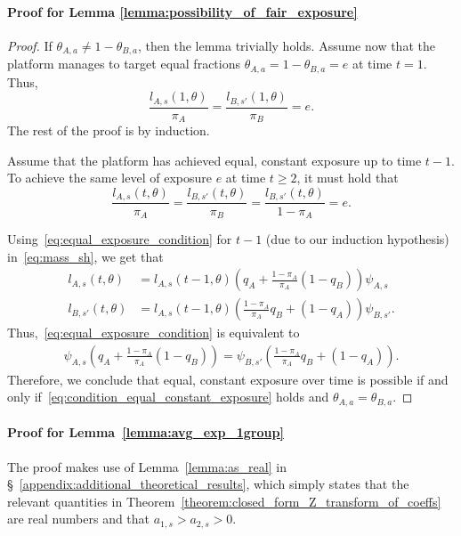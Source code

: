 \documentclass[letterpaper]{article} %
\begin{document}
\paragraph{Proof for Lemma \ref{lemma:possibility_of_fair_exposure}}
\begin{proof}
If $\theta_{A,a} \neq 1-\theta_{B,a} $, then the lemma trivially holds.
Assume now that the platform manages to target equal fractions $\theta_{A,a} = 1-\theta_{B,a} = e$ at time $t=1$. Thus,
\begin{equation*}
    \frac{l_{A,s}(1,\theta)}{\pi_A} = \frac{l_{B,s'}(1,\theta)}{\pi_B}=e.
\end{equation*}
The rest of the proof is by induction.

Assume that the platform has achieved equal, constant exposure up to time $t-1$. To achieve the same level of exposure $e$ at time $t\geq2$, it must hold that 
\begin{equation}
\label{eq:equal_exposure_condition}
\frac{l_{A,s}(t,\theta)}{\pi_A} = \frac{l_{B,s'}(t,\theta)}{\pi_B}= \frac{l_{B,s'}(t,\theta)}{1-\pi_A}=e.
\end{equation}

Using~\eqref{eq:equal_exposure_condition} for $t-1$ (due to our induction hypothesis) in~\eqref{eq:mass_sh}, we get that 
\begin{align*}
    l_{A,s}(t,\theta) &= l_{A,s}(t-1,\theta) \left( q_A + \frac{1-\pi_A}{\pi_A} (1-q_B)  \right) \psi_{A,s} \\
    l_{B,s'}(t,\theta) &= l_{A,s}(t-1,\theta) \left( \frac{1-\pi_A}{\pi_A} q_B + (1-q_A)  \right) \psi_{B,s'}.
\end{align*}
Thus,~\eqref{eq:equal_exposure_condition} is equivalent to
\begin{align*}
    \psi_{A,s}\left(q_A  + \frac{1-\pi_A}{\pi_A} (1-q_B) \right) = \psi_{B,s'}\left( \frac{1-\pi_A}{\pi_A} q_B  + (1-q_A)\right).
\end{align*}
Therefore, we conclude that equal, constant exposure over time is possible if and only if~\eqref{eq:condition_equal_constant_exposure} holds and $\theta_{A,a}= \theta_{B,a}$.
\end{proof}

\paragraph{Proof for Lemma~\ref{lemma:avg_exp_1group}}
The proof makes use of Lemma~\ref{lemma:as_real} in \S~\ref{appendix:additional_theoretical_results}, which simply states that the relevant quantities in Theorem~\ref{theorem:closed_form_Z_transform_of_coeffs} are real numbers and that $a_{1,s} > a_{2,s} > 0$. 
\end{document}
